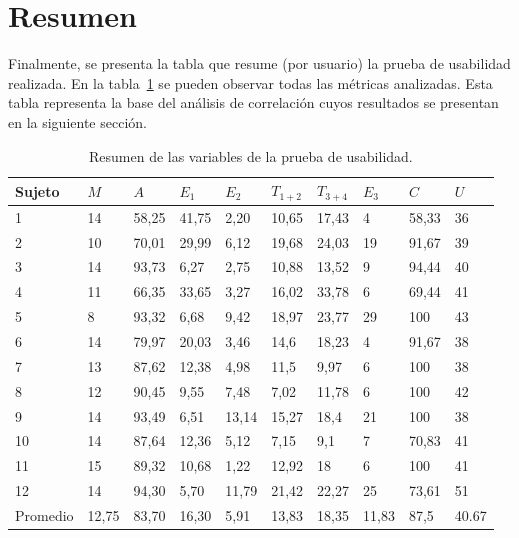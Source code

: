  
\section{Resumen}

Finalmente, se presenta la tabla que resume (por usuario) la prueba de usabilidad realizada. 
En la tabla~\ref{sec:tabla-resumen-prueba} se pueden observar todas las m\'etricas analizadas.
Esta tabla representa la base del an\'alisis de correlaci\'on cuyos resultados se presentan
en la siguiente secci\'on.

\begin{table}[H]
\centering
\footnotesize
\begin{tabular}{|p{1.4cm}|p{1.2cm}|p{1.2cm}|p{1.2cm}|p{1.2cm}|p{1.2cm}|p{1.2cm}|p{1.2cm}|p{1.2cm}|p{1.2cm}|}
\hline
Sujeto &  $M$  &   $A$  &   $E_1$ &  $E_2$  &  $T_{1+2}$  & $T_{3+4}$ & $E_3$ & $C$ & $U$ \\
\hline 
1  & 14 &  58,25 & 41,75 & 2,20  & 10,65 & 17,43 & 4  & 58,33 & 36 \\
2  & 10 &  70,01 & 29,99 & 6,12  & 19,68 & 24,03 & 19 & 91,67 & 39 \\
3  & 14 &  93,73 & 6,27  & 2,75  & 10,88 & 13,52 & 9  & 94,44 & 40 \\
4  & 11 &  66,35 & 33,65 & 3,27  & 16,02 & 33,78 & 6  & 69,44 & 41 \\
5  & 8  &  93,32 & 6,68  & 9,42  & 18,97 & 23,77 & 29 & 100   & 43 \\
6  & 14 &  79,97 & 20,03 & 3,46  & 14,6  & 18,23 & 4  & 91,67 & 38 \\
7  & 13 &  87,62 & 12,38 & 4,98  & 11,5  & 9,97  & 6  & 100   & 38 \\
8  & 12 &  90,45 & 9,55  & 7,48  & 7,02  & 11,78 & 6  & 100   & 42 \\
9  & 14 &  93,49 & 6,51  & 13,14 & 15,27 & 18,4  & 21 & 100   & 38 \\
10 & 14 & 87,64 & 12,36 & 5,12  & 7,15  & 9,1   & 7  & 70,83  & 41 \\
11 & 15 & 89,32 & 10,68 & 1,22  & 12,92 & 18      & 6  & 100  & 41 \\
12 & 14 & 94,30 & 5,70  & 11,79 & 21,42 & 22,27 & 25 & 73,61  & 51 \\
\hline 
Promedio & 12,75 & 83,70 & 16,30 & 5,91 & 13,83  & 18,35  & 11,83 & 87,5  & 40.67 \\
\hline
\end{tabular}
\caption{Resumen de las variables de la prueba de usabilidad.}
\label{sec:tabla-resumen-prueba}
\end{table}

